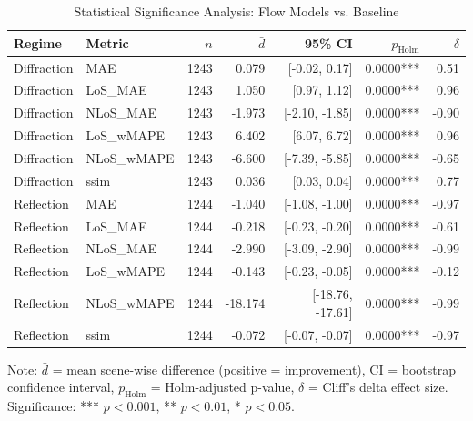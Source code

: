 \begin{table}[htbp]
\centering
\caption{Statistical Significance Analysis: Flow Models vs. Baseline}
\label{tab:significance}
\begin{tabular}{llrrrrr}
\hline
Regime & Metric & $n$ & $\bar{d}$ & 95\% CI & $p_{\text{Holm}}$ & $\delta$ \\
\hline
Diffraction & MAE & 1243 & 0.079 & [-0.02, 0.17] & 0.0000*** & 0.51 \\
Diffraction & LoS_MAE & 1243 & 1.050 & [0.97, 1.12] & 0.0000*** & 0.96 \\
Diffraction & NLoS_MAE & 1243 & -1.973 & [-2.10, -1.85] & 0.0000*** & -0.90 \\
Diffraction & LoS_wMAPE & 1243 & 6.402 & [6.07, 6.72] & 0.0000*** & 0.96 \\
Diffraction & NLoS_wMAPE & 1243 & -6.600 & [-7.39, -5.85] & 0.0000*** & -0.65 \\
Diffraction & ssim & 1243 & 0.036 & [0.03, 0.04] & 0.0000*** & 0.77 \\
Reflection & MAE & 1244 & -1.040 & [-1.08, -1.00] & 0.0000*** & -0.97 \\
Reflection & LoS_MAE & 1244 & -0.218 & [-0.23, -0.20] & 0.0000*** & -0.61 \\
Reflection & NLoS_MAE & 1244 & -2.990 & [-3.09, -2.90] & 0.0000*** & -0.99 \\
Reflection & LoS_wMAPE & 1244 & -0.143 & [-0.23, -0.05] & 0.0000*** & -0.12 \\
Reflection & NLoS_wMAPE & 1244 & -18.174 & [-18.76, -17.61] & 0.0000*** & -0.99 \\
Reflection & ssim & 1244 & -0.072 & [-0.07, -0.07] & 0.0000*** & -0.97 \\
\hline
\end{tabular}
\begin{tablenotes}
\small
\item Note: $\bar{d}$ = mean scene-wise difference (positive = improvement), CI = bootstrap confidence interval, $p_{\text{Holm}}$ = Holm-adjusted p-value, $\delta$ = Cliff's delta effect size. Significance: *** $p<0.001$, ** $p<0.01$, * $p<0.05$.
\end{tablenotes}
\end{table}
